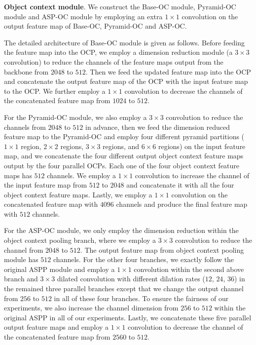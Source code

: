 \documentclass[10pt,twocolumn,letterpaper]{article}
\begin{document}
\vspace{.1cm}
\noindent\textbf{Object context module}.
We construct the Base-OC module, Pyramid-OC module and ASP-OC module
by employing an extra $1 \times 1$ convolution on the output feature map of 
Base-OC, Pyramid-OC and ASP-OC.

The detailed architecture of Base-OC module is given as follows.
Before feeding the feature map into the OCP,
we employ a dimension reduction module (a $3 \times 3$ convolution)
to reduce the channels of the feature maps output from the backbone from $2048$ to $512$. 
Then we feed the updated feature map into the 
OCP and concatenate the output feature map of the OCP with the 
input feature map to the OCP.
We further employ a $1 \times 1$ convolution 
to decrease the channels of
the concatenated feature map from $1024$ to $512$.


For the Pyramid-OC module, we also employ a $3 \times 3$ convolution to reduce the channels
from $2048$ to $512$ in advance,
then we feed the dimension reduced feature map to the Pyramid-OC and employ four different pyramid partitions ($1\times 1$ region,
$2\times 2$ regions,
$3\times 3$ regions,
and $6 \times 6$ regions) on the 
input feature map,
and we concatenate the four different output object context feature maps output
by the four parallel OCPs.
Each one of the four object context feature maps has $512$ channels.
We employ a $1 \times 1$ convolution to increase the channel of the input feature map
from $512$ to $2048$ and concatenate it with all the four object context feature maps.
Lastly, we employ a $1 \times 1$ convolution on the concatenated feature map with $4096$ channels and produce the final feature map with $512$ channels.

For the ASP-OC module, we only employ the dimension reduction within the object context pooling branch, where we employ a $3 \times 3$ convolution to reduce the channel from $2048$ to $512$. The output feature map from object context pooling module has $512$ channels.
For the other four branches, we exactly follow the original ASPP module and employ a $1 \times 1$ convolution within the second above branch and $3 \times 3$ dilated convolution with different dilation rates ($12$, $24$, $36$) in the remained three parallel branches except that we change the output channel from $256$ to $512$ in all of these four branches.
To ensure the fairness of our experiments, we also increase the channel dimension from $256$ to $512$ within the original ASPP in all of our experiments.
Lastly, we concatenate these five parallel output feature maps and employ a $1 \times 1$ convolution
to decrease the channel of the concatenated feature map from $2560$ to $512$.
\end{document}

